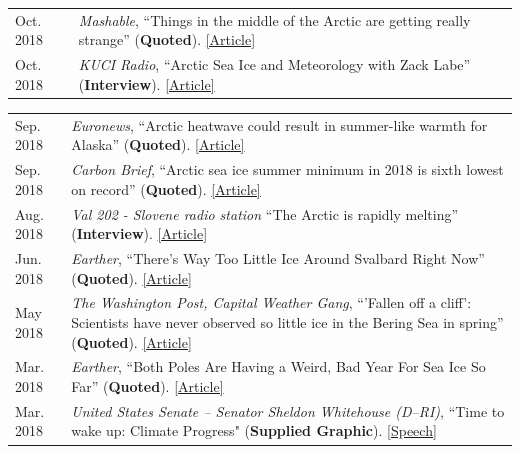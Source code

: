 \documentclass[margin,line,palatino,courier,10pt]{res}
\begin{document}
\begin{resume}
\begin{tabular}{@{}p{0.9in}p{4in}}
Oct. 2018 & \textit{Mashable}, ``Things in the middle of the Arctic are getting really strange'' (\textbf{Quoted}). \href{https://mashable.com/article/low-arctic-ice-central-basin/#xQmvXhcFJPqH}{[Article]}\\
Oct. 2018 & \textit{KUCI Radio}, ``Arctic Sea Ice and Meteorology with Zack Labe'' (\textbf{Interview}). \href{https://thesciencespiel.org/2018/10/08/october-8-2018-arctic-sea-ice-and-meteorology-with-zack-labe/}{[Article]}\\
\end{tabular}
\begin{tabular}{@{}p{0.9in}p{4in}}
Sep. 2018 & \textit{Euronews}, ``Arctic heatwave could result in summer-like warmth for Alaska'' (\textbf{Quoted}). \href{https://www.euronews.com/2018/09/29/arctic-heatwave-could-result-in-summer-like-warmth-in-alaska}{[Article]}\\
Sep. 2018 & \textit{Carbon Brief}, ``Arctic sea ice summer minimum in 2018 is sixth lowest on record'' (\textbf{Quoted}). \href{https://www.carbonbrief.org/arctic-sea-ice-summer-minimum-in-2018-is-sixth-lowest-on-record}{[Article]}\\
Aug. 2018 & \textit{Val 202 - Slovene radio station} ``The Arctic is rapidly melting'' (\textbf{Interview}). \href{https://val202.rtvslo.si/2018/08/sonce-je-odprlo-zemljin-hladilnik/}{[Article]}\\
Jun. 2018 & \textit{Earther}, ``There's Way Too Little Ice Around Svalbard Right Now'' (\textbf{Quoted}). \href{https://earther.com/theres-way-too-little-ice-around-svalbard-right-now-1826567780}{[Article]}\\
May 2018 & \textit{The Washington Post, Capital Weather Gang}, ``'Fallen off a cliff': Scientists have never observed so little ice in the Bering Sea in spring'' (\textbf{Quoted}). \href{https://www.washingtonpost.com/news/capital-weather-gang/wp/2018/05/03/fallen-off-a-cliff-scientists-have-never-observed-so-little-ice-in-the-bering-sea-in-spring/?noredirect=on&utm_term=.cbcf2781b5e4}{[Article]}\\
Mar. 2018 & \textit{Earther}, ``Both Poles Are Having a Weird, Bad Year For Sea Ice So Far'' (\textbf{Quoted}). \href{https://earther.com/both-poles-are-having-a-weird-bad-year-for-sea-ice-so-1824074352}{[Article]}\\
Mar. 2018 & \textit{United States Senate -- Senator Sheldon Whitehouse (D--RI)}, ``Time to wake up: Climate Progress" (\textbf{Supplied Graphic}). \href{https://www.youtube.com/watch?v=C_E5OQgt2SE}{[Speech]}\\

\end{tabular}
\end{resume}
\end{document}
